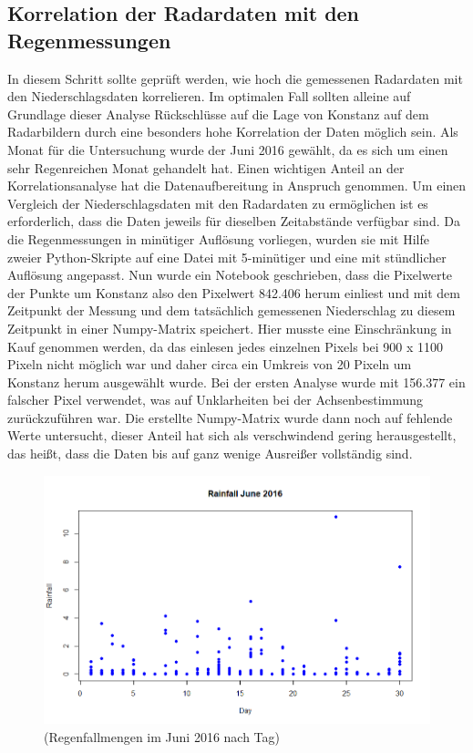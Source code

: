 \subsection{Korrelation der Radardaten mit den Regenmessungen}

In diesem Schritt sollte geprüft werden, wie hoch die gemessenen Radardaten mit den Niederschlagsdaten korrelieren. Im optimalen Fall sollten alleine auf Grundlage dieser Analyse Rückschlüsse auf die Lage von Konstanz auf dem Radarbildern durch eine besonders hohe Korrelation der Daten möglich sein. Als Monat für die Untersuchung wurde der Juni 2016 gewählt, da es sich um einen sehr Regenreichen Monat gehandelt hat.
Einen wichtigen Anteil an der Korrelationsanalyse hat die Datenaufbereitung in Anspruch genommen. Um einen Vergleich der Niederschlagsdaten mit den Radardaten zu ermöglichen ist es erforderlich, dass die Daten jeweils für dieselben Zeitabstände verfügbar sind. Da die Regenmessungen in minütiger Auflösung vorliegen, wurden sie mit Hilfe zweier Python-Skripte auf eine Datei mit 5-minütiger und eine mit stündlicher Auflösung angepasst. Nun wurde ein Notebook geschrieben, dass die Pixelwerte der Punkte um Konstanz also den Pixelwert 842.406 herum einliest und mit dem Zeitpunkt der Messung und dem tatsächlich gemessenen Niederschlag zu diesem Zeitpunkt in einer Numpy-Matrix speichert. Hier musste eine Einschränkung in Kauf genommen werden, da das einlesen jedes einzelnen Pixels bei 900 x 1100 Pixeln nicht möglich war und daher circa ein Umkreis von 20 Pixeln um Konstanz herum ausgewählt wurde. Bei der ersten Analyse wurde mit 156.377 ein falscher Pixel verwendet, was auf Unklarheiten bei der Achsenbestimmung zurückzuführen war. Die erstellte Numpy-Matrix wurde dann noch auf fehlende Werte untersucht, dieser Anteil hat sich als verschwindend gering herausgestellt, das heißt, dass die Daten bis auf ganz wenige Ausreißer vollständig sind. 
\begin{figure}[ht]
\centering
\includegraphics[width=\linewidth]{pics/plot_rainfall_day}
\caption{(Regenfallmengen im Juni 2016 nach Tag)}
\label{fig:Rainfall}
\end{figure}
